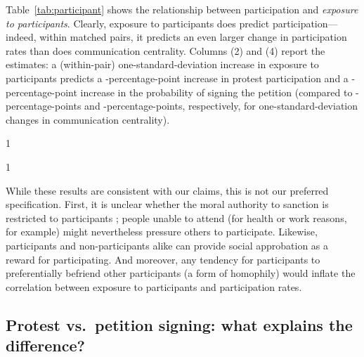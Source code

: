 \documentclass[12pt]{article}
\newcommand{\StepCountInFileNames}{6}
\newcommand{\jop}{0} %
\begin{document}
Table~\ref{tab:participant} shows the relationship between participation and \emph{exposure to participants}. Clearly, exposure to participants does predict participation---indeed, within matched pairs, it predicts an even larger change in participation rates than does communication centrality. Columns (2) and (4) report the estimates: a (within-pair) one-stan\-dard-dev\-iation increase in exposure to participants predicts a \unskip-percentage-point increase in protest participation and a \unskip-percentage-point increase in the probability of signing the petition (compared to \unskip-percentage-points and  \unskip-percentage-points, respectively, for one-standard-deviation changes in communication centrality).


	\if\jop1
	\linespread{1}\selectfont
	\fi



	\if\jop1
	\linespread{2}\selectfont
	\fi

While these results are consistent with our claims, this is not our preferred specification. First, it is unclear whether the moral authority to sanction is restricted to participants \citep{BanerjeeMicrofinance}; people unable to attend (for health or work reasons, for example) might nevertheless pressure others to participate. Likewise, participants and non-participants alike can provide social approbation as a reward for participating. And moreover, any tendency for participants to preferentially befriend other participants (a form of homophily) would inflate the correlation between exposure to participants and participation rates.







\subsection{Protest vs.\ petition signing: what explains the difference?}\label{sec:survey}
\end{document}
